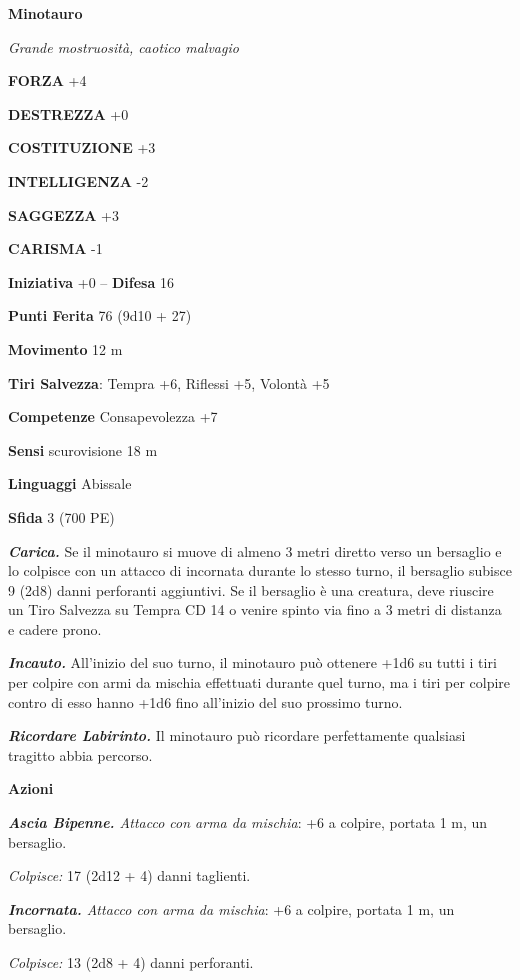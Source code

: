 \begin{multicols}{2}
\medskip{}\textbf{Minotauro}

\emph{Grande mostruosità, caotico malvagio}

\textbf{FORZA} +4

\textbf{DESTREZZA} +0

\textbf{COSTITUZIONE} +3

\textbf{INTELLIGENZA} -2

\textbf{SAGGEZZA} +3

\textbf{CARISMA} -1

\textbf{Iniziativa} +0 -- \textbf{Difesa} 16

\textbf{Punti Ferita} 76 (9d10 + 27)

\textbf{Movimento} 12 m

\textbf{Tiri Salvezza}: Tempra +6, Riflessi +5, Volontà +5

\textbf{Competenze} Consapevolezza +7

\textbf{Sensi} scurovisione 18 m

\textbf{Linguaggi} Abissale

\textbf{Sfida} 3 (700 PE)

\emph{\textbf{Carica.}} Se il minotauro si muove di almeno 3 metri diretto verso un bersaglio e lo colpisce con un attacco di incornata durante lo stesso turno, il bersaglio subisce 9 (2d8) danni perforanti aggiuntivi. Se il bersaglio è una creatura, deve riuscire un Tiro Salvezza su Tempra CD 14 o venire spinto via fino a 3 metri di distanza e cadere prono.

\emph{\textbf{Incauto.}} All'inizio del suo turno, il minotauro può ottenere +1d6 su tutti i tiri per colpire con armi da mischia effettuati durante quel turno, ma i tiri per colpire contro di esso hanno +1d6 fino all'inizio del suo prossimo turno.

\emph{\textbf{Ricordare Labirinto.}} Il minotauro può ricordare perfettamente qualsiasi tragitto abbia percorso.

\textbf{Azioni}

\emph{\textbf{Ascia Bipenne.} Attacco con arma da mischia}: +6 a colpire, portata 1 m, un bersaglio.

\emph{Colpisce:} 17 (2d12 + 4) danni taglienti.

\emph{\textbf{Incornata.} Attacco con arma da mischia}: +6 a colpire, portata 1 m, un bersaglio.

\emph{Colpisce:} 13 (2d8 + 4) danni perforanti.


\end{multicols}
